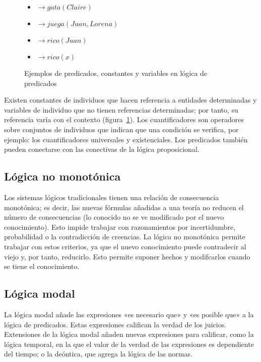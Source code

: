 \documentclass[11pt,captions=nooneline,DIV=14, parskip=full]{scrartcl}
\begin{document}
\begin{figure}[!htbp]
\begin{itemize}
\item {} $ \to gata(Claire) $
\item {} $ \to juega(Juan,Lorena) $
\item {} $ \to rico(Juan) $
\item {} $ \to rico(x) $
\end{itemize}
\caption{Ejemplos de predicados, constantes y variables en lógica de predicados}
\label{fig:predicados}
\end{figure}

Existen constantes de individuos que hacen referencia a entidades determinadas y variables de individuo que no tienen referencias determinadas; por tanto, su referencia varía con el contexto (figura~\ref{fig:predicados}). Los cuantificadores son operadores sobre conjuntos de individuos que indican que una condición se verifica, por ejemplo: los cuantificadores universales y existenciales. Los predicados también pueden conectarse con las conectivas de la lógica proposicional.

\subsection{Lógica no monotónica}

Los sistemas lógicos tradicionales tienen una relación de consecuencia monotónica; es decir, las nuevas fórmulas añadidas a una teoría no reducen el número de consecuencias (lo conocido no se ve modificado por el nuevo conocimiento). Esto impide trabajar con razonamientos por incertidumbre, probabilidad o la contradicción de creencias. La lógica no monotónica permite trabajar con estos criterios, ya que el nuevo conocimiento puede contradecir al viejo y, por tanto, reducirlo. Esto permite suponer hechos y modifcarlos cuando se tiene el conocimiento.

\subsection{Lógica modal}

La lógica modal añade las expresiones «es necesario que» y «es posible que» a la lógica de predicados. Estas expresiones califican la verdad de los juicios. Extensiones de la lógica modal añaden nuevas expresiones para calificar, como la lógica temporal, en la que el valor de la verdad de las expresiones es dependiente del tiempo; o la deóntica, que agrega la lógica de las normas.
\end{document}
